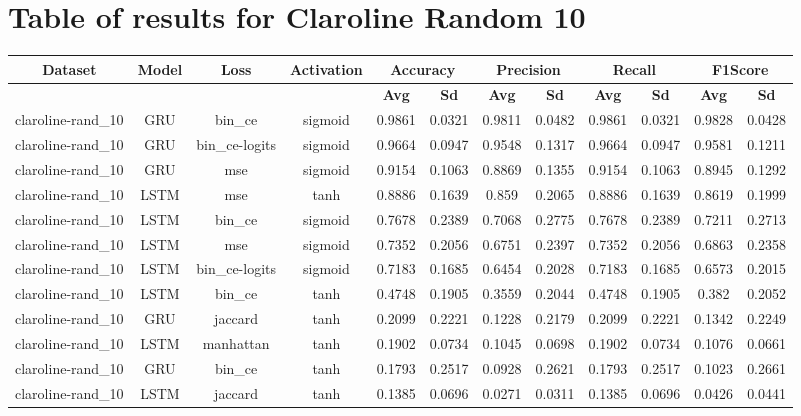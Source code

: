 \documentclass{article}%
\begin{document}
\section{Table of results for Claroline Random 10}%
\label{sec:TableofresultsforClarolineRandom10}%
\begin{tabular}{|c|c|c|c|c|c|c|c|c|c|c|c|}%
\hline%
\rowcolor{lightgray!70}%
\textbf{Dataset}&\textbf{Model}&\textbf{Loss}&\textbf{Activation}&\multicolumn{2}{c|}{\textbf{Accuracy}}&\multicolumn{2}{c|}{\textbf{Precision}}&\multicolumn{2}{c|}{\textbf{Recall}}&\multicolumn{2}{c|}{\textbf{F1Score}}\\%
\hline%
\rowcolor{lightgray!70}%
\textbf{}&\textbf{}&\textbf{}&\textbf{}&\textbf{Avg}&\textbf{Sd}&\textbf{Avg}&\textbf{Sd}&\textbf{Avg}&\textbf{Sd}&\textbf{Avg}&\textbf{Sd}\\%
\hline%
claroline{-}rand\_10&GRU&bin\_ce&sigmoid&0.9861&0.0321&0.9811&0.0482&0.9861&0.0321&0.9828&0.0428\\%
\hline%
claroline{-}rand\_10&GRU&bin\_ce{-}logits&sigmoid&0.9664&0.0947&0.9548&0.1317&0.9664&0.0947&0.9581&0.1211\\%
\hline%
claroline{-}rand\_10&GRU&mse&sigmoid&0.9154&0.1063&0.8869&0.1355&0.9154&0.1063&0.8945&0.1292\\%
\hline%
claroline{-}rand\_10&LSTM&mse&tanh&0.8886&0.1639&0.859&0.2065&0.8886&0.1639&0.8619&0.1999\\%
\hline%
claroline{-}rand\_10&LSTM&bin\_ce&sigmoid&0.7678&0.2389&0.7068&0.2775&0.7678&0.2389&0.7211&0.2713\\%
\hline%
claroline{-}rand\_10&LSTM&mse&sigmoid&0.7352&0.2056&0.6751&0.2397&0.7352&0.2056&0.6863&0.2358\\%
\hline%
claroline{-}rand\_10&LSTM&bin\_ce{-}logits&sigmoid&0.7183&0.1685&0.6454&0.2028&0.7183&0.1685&0.6573&0.2015\\%
\hline%
claroline{-}rand\_10&LSTM&bin\_ce&tanh&0.4748&0.1905&0.3559&0.2044&0.4748&0.1905&0.382&0.2052\\%
\hline%
claroline{-}rand\_10&GRU&jaccard&tanh&0.2099&0.2221&0.1228&0.2179&0.2099&0.2221&0.1342&0.2249\\%
\hline%
claroline{-}rand\_10&LSTM&manhattan&tanh&0.1902&0.0734&0.1045&0.0698&0.1902&0.0734&0.1076&0.0661\\%
\hline%
claroline{-}rand\_10&GRU&bin\_ce&tanh&0.1793&0.2517&0.0928&0.2621&0.1793&0.2517&0.1023&0.2661\\%
\hline%
claroline{-}rand\_10&LSTM&jaccard&tanh&0.1385&0.0696&0.0271&0.0311&0.1385&0.0696&0.0426&0.0441\\%

\end{tabular}
\end{document}
